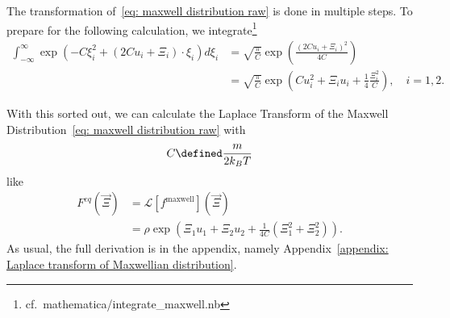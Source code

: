 The transformation of~\eqref{eq: maxwell distribution raw} is done in multiple steps.
To prepare for the following calculation, we integrate\footnote{cf.\ mathematica/integrate\_maxwell.nb}
\begin{equation}
  \label{eq:integrate exponential sage}
  \begin{aligned}
    \int_{-\infty}^{\infty} \exp \left(-C \xi_i^2 + (2Cu_i + \Xi_i)\cdot\xi_i \right) d\xi_i
    & = \sqrt{\frac{\pi}{C}}\exp \left( \frac{{(2Cu_i + \Xi_i)}^2}{4C}\right)
    \\
    & = \sqrt{\frac{\pi}{C}}\exp \left(Cu_i^2 + \Xi_i u_i + \frac{1}{4} \frac{\Xi_i^2}{C}\right),\quad i=1,2
    .
  \end{aligned}
\end{equation}

With this sorted out, we can calculate the Laplace Transform of the Maxwell Distribution~\eqref{eq: maxwell distribution raw} with
\begin{equation}
  C \defined \frac{m}{2 k_B T}
\end{equation}
like
\begin{equation}
  \label{eq: laplace of maxwell}
  \begin{aligned}
    F^{eq}(\vec{\Xi}) & = \mathcal{L}[f^{\text{maxwell}}](\vec{\Xi})
    \\& = \rho
      \exp \left( \Xi_1 u_1 + \Xi_2 u_2 + \frac{1}{4C}\left(\Xi_1^2 + \Xi_2^2 \right)\right).
  \end{aligned}
\end{equation}
As usual, the full derivation is in the appendix, namely Appendix~\ref{appendix: Laplace transform of Maxwellian distribution}.

